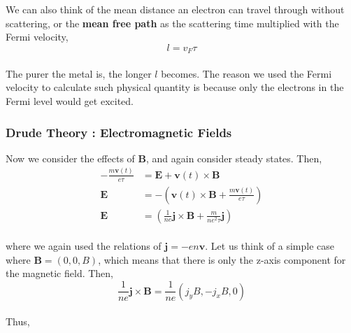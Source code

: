 \documentclass[paper=a4, fontsize=11pt]{scrartcl}
\begin{document}
We can also think of the mean distance an electron can travel through without scattering, or the \textbf{mean free path} as the scattering time multiplied with the Fermi velocity, \\

\begin{equation}\nonumber
	l = v_F \tau 
\end{equation}\\
 
The purer the metal is, the longer $l$ becomes. The reason we used the Fermi velocity to calculate such physical quantity is because only the electrons in the Fermi level would get excited.\\
 
\vspace{0.15in}
\subsubsection{Drude Theory : Electromagnetic Fields}
\vspace{0.15in}

Now we consider the effects of $\mathbf{B}$, and again consider steady states. Then, \\

\begin{equation}\nonumber
\begin{split}
		-\frac{m\mathbf{v}(t)}{e \tau} &=  \mathbf{E}  + \mathbf{v}(t) \times \mathbf{B} \\[2.5ex]
		 \mathbf{E} &= - \left(  \mathbf{v}(t) \times \mathbf{B} + \frac{m\mathbf{v}(t)}{e \tau} \right)\\[2.5ex]
		  \mathbf{E} &= \left(  \frac{1}{ne}\mathbf{j} \times    \mathbf{B} +\frac{m}{ne^2 \tau}  \mathbf{j}\right)
\end{split}
\end{equation}\\

where we again used the relations of $\mathbf{j} = -en \mathbf{v}$. Let us think of a simple case where $\mathbf{B}=(0,0,B)$, which means that there is only the z-axis component for the magnetic field. Then, \\

\begin{equation}\nonumber
\frac{1}{ne} \mathbf{j} \times \mathbf{B} = \frac{1}{ne} \left( j_y B , -j_x B , 0 \right)
\end{equation}\\

Thus, \\
\end{document}
